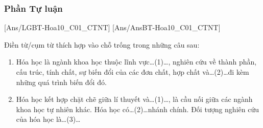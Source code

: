 \documentclass[Main.tex]{subfiles}
\begin{document}
\subsubsection{Phần Tự luận}
[Ans/LGBT-Hoa10_C01_CTNT]
[Ans/AnsBT-Hoa10_C01_CTNT]
\hienthiloigiaibt
	\begin{bt}
		Điền từ/cụm từ thích hợp vào chỗ trống trong những câu sau:
		\begin{enumerate}
			\item Hóa học là ngành khoa học thuộc lĩnh vực\ldots (1)\ldots, nghiên cứu về thành phần, cấu trúc, tính chất, sự biến đổi của các đơn chất, hợp chất và\ldots (2)\ldots đi kèm những quá trình biến đổi đó.
			\item Hóa học kết hợp chặt chẽ giữa lí thuyết và\ldots (1)\ldots, là cầu nối giữa các ngành khoa học tự nhiên khác. Hóa học có\ldots (2)\ldots nhánh chính. Đối tượng nghiên cứu của hóa học là\ldots (3)\ldots
		\end{enumerate}
	\end{bt}
	
\end{document}
